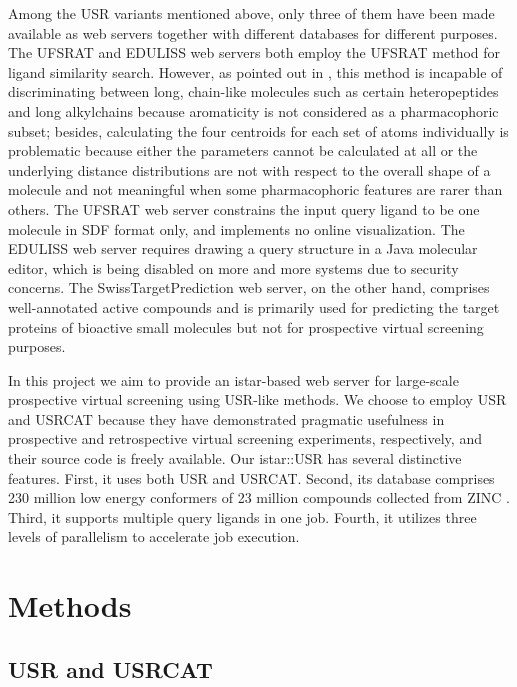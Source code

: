 Among the USR variants mentioned above, only three of them \citep{1436,1437,1408} have been made available as web servers together with different databases for different purposes. The UFSRAT \citep{1436} and EDULISS \citep{1437} web servers both employ the UFSRAT \citep{1436} method for ligand similarity search. However, as pointed out in \citep{1331}, this method is incapable of discriminating between long, chain-like molecules such as certain heteropeptides and long alkylchains because aromaticity is not considered as a pharmacophoric subset; besides, calculating the four centroids for each set of atoms individually is problematic because either the parameters cannot be calculated at all or the underlying distance distributions are not with respect to the overall shape of a molecule and not meaningful when some pharmacophoric features are rarer than others. The UFSRAT \citep{1436} web server constrains the input query ligand to be one molecule in SDF format only, and implements no online visualization. The EDULISS \citep{1437} web server requires drawing a query structure in a Java molecular editor, which is being disabled on more and more systems due to security concerns. The SwissTargetPrediction \citep{1408} web server, on the other hand, comprises well-annotated active compounds and is primarily used for predicting the target proteins of bioactive small molecules but not for prospective virtual screening purposes.

In this project we aim to provide an istar-based \citep{1362} web server for large-scale prospective virtual screening using USR-like methods. We choose to employ USR \citep{1379} and USRCAT \citep{1331} because they have demonstrated pragmatic usefulness in prospective \citep{1380} and retrospective \citep{1331} virtual screening experiments, respectively, and their source code is freely available. Our istar::USR has several distinctive features. First, it uses both USR and USRCAT. Second, its database comprises 230 million low energy conformers of 23 million compounds collected from ZINC \cite{532,1178}. Third, it supports multiple query ligands in one job. Fourth, it utilizes three levels of parallelism to accelerate job execution.

\section{Methods}

\subsection{USR and USRCAT}

